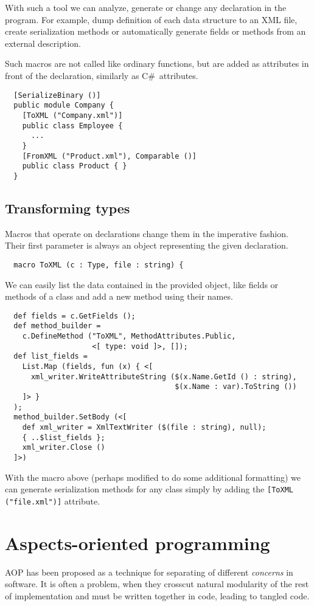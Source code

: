 \documentclass{llncs}
\newcommand{\cs}[0]{C\#}
\begin{document}
With such a tool we can analyze, generate or change any declaration
in the program. For example, dump definition of each data structure 
to an XML file, create serialization methods or automatically
generate fields or methods from an external description.

Such macros are not called like ordinary functions, but are added as
attributes in front of the declaration, similarly as \cs\ attributes.

\begin{verbatim}
  [SerializeBinary ()] 
  public module Company {
    [ToXML ("Company.xml")] 
    public class Employee {
      ...
    }
    [FromXML ("Product.xml"), Comparable ()] 
    public class Product { }
  }
\end{verbatim}

\subsection{Transforming types}
Macros that operate on declarations change them in the imperative fashion.
Their first parameter is always an object representing the given 
declaration. 

\begin{verbatim}
  macro ToXML (c : Type, file : string) { 
\end{verbatim}

We can easily list the data contained in the provided object, like fields 
or methods of a class and add a new method using their names.

\begin{verbatim}
  def fields = c.GetFields ();
  def method_builder = 
    c.DefineMethod ("ToXML", MethodAttributes.Public, 
                    <[ type: void ]>, []);
  def list_fields = 
    List.Map (fields, fun (x) { <[ 
      xml_writer.WriteAttributeString ($(x.Name.GetId () : string), 
                                       $(x.Name : var).ToString ()) 
    ]> }
  );
  method_builder.SetBody (<[
    def xml_writer = XmlTextWriter ($(file : string), null);
    { ..$list_fields };
    xml_writer.Close ()
  ]>)
\end{verbatim}

With the macro above (perhaps modified to do some additional formatting)
we can generate serialization methods for any class simply by adding 
the \verb,[ToXML ("file.xml")], attribute.

\section{Aspects-oriented programming}
AOP has been proposed as a technique for separating of different 
\emph{concerns} in software. It is often a problem, when they crosscut 
natural modularity of the rest of implementation and must be written 
together in code, leading to tangled code. 
\end{document}
